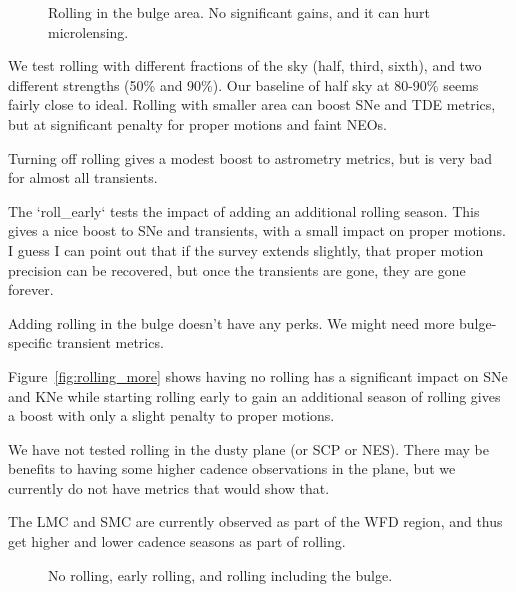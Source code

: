 \begin{figure}
\caption{Rolling in the bulge area. No significant gains, and it can hurt microlensing. \label{fig:rolling_bulge}}
\end{figure}

We test rolling with different fractions of the sky (half, third, sixth), and two different strengths (50\% and 90\%). 
Our baseline of half sky at 80-90\% seems fairly close to ideal. Rolling with smaller area can boost SNe and TDE metrics, but at significant penalty for proper motions and faint NEOs.

Turning off rolling gives a modest boost to astrometry metrics, but is very bad for almost all transients. 

The `roll\_early` tests the impact of adding an additional rolling season. This gives a nice boost to SNe and transients, with a small impact on proper motions. I guess I can point out that if the survey extends slightly, that proper motion precision can be recovered, but once the transients are gone, they are gone forever.

Adding rolling in the bulge doesn't have any perks. We might need more bulge-specific transient metrics.


Figure~\ref{fig:rolling_more} shows having no rolling has a significant impact on SNe and KNe while starting rolling early to gain an additional season of rolling gives a boost with only a slight penalty to proper motions. 

We have not tested rolling in the dusty plane (or SCP or NES). There may be benefits to having some higher cadence observations in the plane, but we currently do not have metrics that would show that.

The LMC and SMC are currently observed as part of the WFD region, and thus get higher and lower cadence seasons as part of rolling. 


\begin{figure}
\caption{No rolling, early rolling, and rolling including the bulge.\label{fig:rolling_normal}}
\end{figure}


